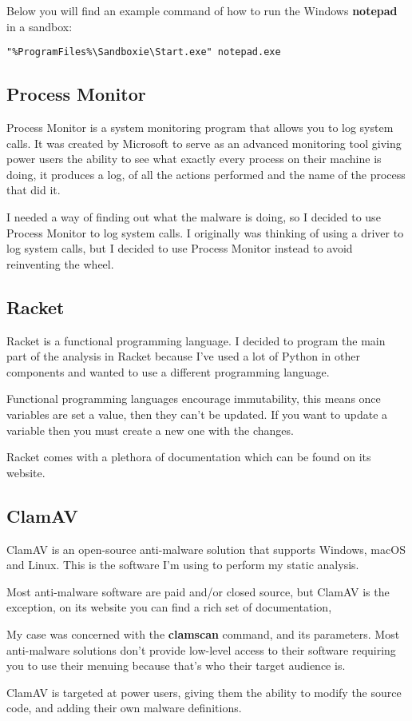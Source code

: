 Below you will find an example command of how to run the Windows
\textbf{notepad} in a sandbox:

\begin{lstlisting}
"%ProgramFiles%\Sandboxie\Start.exe" notepad.exe
\end{lstlisting}

\subsection{Process Monitor}
Process Monitor is a system monitoring program that allows you to log system calls.
It was created by Microsoft to serve as an advanced monitoring tool giving power users
the ability to see what exactly every process on their machine is doing,
it produces a log, of all the actions performed and the name of the process that did it.

I needed a way of finding out what the malware is doing,
so I decided to use Process Monitor to log system calls.
I originally was thinking of using a driver to log system calls,
but I decided to use Process Monitor instead to avoid reinventing the wheel.

\subsection{Racket}
Racket is a functional programming language.
I decided to program the main part of the analysis in Racket
because I've used a lot of Python in other components and
wanted to use a different programming language.

Functional programming languages encourage immutability,
this means once variables are set a value, then they can't be updated.
If you want to update a variable then you must create a new one with
the changes.

Racket comes with a plethora of documentation which can be found on its website.

\subsection{ClamAV}
ClamAV is an open-source anti-malware solution that
supports Windows, macOS and Linux.
This is the software I'm using to perform my static analysis.

Most anti-malware software are paid and/or closed source,
but ClamAV is the exception, on its website you can find a rich set of documentation,

My case was concerned with the \textbf{clamscan} command, and its parameters.
Most anti-malware solutions don't provide low-level access to their software
requiring you to use their menuing because that's who their target audience is.

ClamAV is targeted at power users,
giving them the ability to modify the source code,
and adding their own malware definitions.
